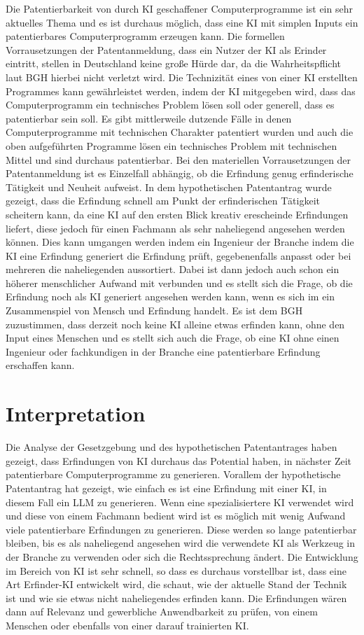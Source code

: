 Die Patentierbarkeit von durch KI 
geschaffener Computerprogramme ist ein sehr aktuelles Thema 
und es ist durchaus möglich, dass eine KI mit simplen
Inputs ein patentierbares Computerprogramm erzeugen kann.
Die formellen Vorrausetzungen der Patentanmeldung, 
dass ein Nutzer der KI als
Erinder eintritt, stellen in Deutschland keine große Hürde
dar, da die Wahrheitspflicht laut BGH hierbei
nicht verletzt wird. Die Technizität eines von einer
KI erstellten Programmes 
kann gewährleistet werden, 
indem der KI mitgegeben wird, dass das 
Computerprogramm ein technisches Problem lösen 
soll oder generell, dass es patentierbar sein soll.
Es gibt mittlerweile dutzende Fälle in denen 
Computerprogramme mit technischen Charakter patentiert wurden
und auch die oben aufgeführten Programme lösen
ein technisches Problem mit technischen Mittel und
sind durchaus patentierbar. Bei den materiellen
Vorrausetzungen der Patentanmeldung ist es Einzelfall
abhängig, ob die Erfindung genug erfinderische Tätigkeit
und Neuheit aufweist. In dem hypothetischen
Patentantrag wurde gezeigt, dass die Erfindung
schnell am Punkt der erfinderischen Tätigkeit scheitern
kann, da eine KI auf den ersten Blick kreativ erescheinde
Erfindungen liefert, diese jedoch für einen Fachmann
als sehr naheliegend angesehen werden können.
Dies kann umgangen werden indem ein Ingenieur der 
Branche indem die KI eine Erfindung generiert die 
Erfindung prüft, gegebenenfalls anpasst oder bei
mehreren die naheliegenden aussortiert. Dabei ist 
dann jedoch auch schon ein höherer menschlicher 
Aufwand mit verbunden und es stellt sich die Frage,
ob die Erfindung noch als KI generiert angesehen werden
kann, wenn es sich im ein Zusammenspiel von Mensch
und Erfindung handelt. Es ist dem BGH zuzustimmen, 
dass derzeit noch keine KI alleine etwas erfinden kann,
ohne den Input eines Menschen und es stellt sich
auch die Frage, ob eine KI ohne einen Ingenieur
oder fachkundigen in der Branche eine patentierbare
Erfindung erschaffen kann.
\section{Interpretation}
Die Analyse der Gesetzgebung und des hypothetischen Patentantrages
haben gezeigt, dass Erfindungen von KI durchaus das Potential
haben, in nächster Zeit patentierbare Computerprogramme zu
generieren. Vorallem der hypothetische Patentantrag hat gezeigt,
wie einfach es ist eine Erfindung mit einer KI, in diesem Fall
ein LLM zu generieren. Wenn eine spezialisiertere KI verwendet 
wird und diese von einem Fachmann bedient wird ist es
möglich mit wenig Aufwand viele patentierbare Erfindungen zu 
generieren. Diese werden so lange patentierbar bleiben,
bis es als naheliegend angesehen wird die verwendete KI
als Werkzeug in der Branche zu verwenden oder sich
die Rechtssprechung ändert. Die Entwicklung im 
Bereich von KI ist sehr schnell, so dass es durchaus vorstellbar
ist, dass eine Art Erfinder-KI entwickelt wird, die schaut,
wie der aktuelle Stand der Technik ist und wie sie etwas nicht 
naheliegendes erfinden kann. Die Erfindungen wären 
dann auf Relevanz und gewerbliche Anwendbarkeit zu prüfen, 
von einem Menschen oder ebenfalls von einer darauf 
trainierten KI. 